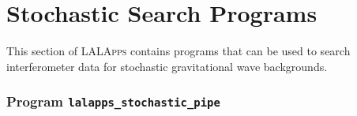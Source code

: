 
\chapter{Stochastic Search Programs}
\label{chapter:stochastic}

This section of \textsc{LALApps} contains programs that can be used to
search interferometer data for stochastic gravitational wave
backgrounds.

\clearpage


\clearpage
\subsection{Program \texttt{lalapps\_stochastic\_pipe}}
\label{program:stochastic-pipeline}

